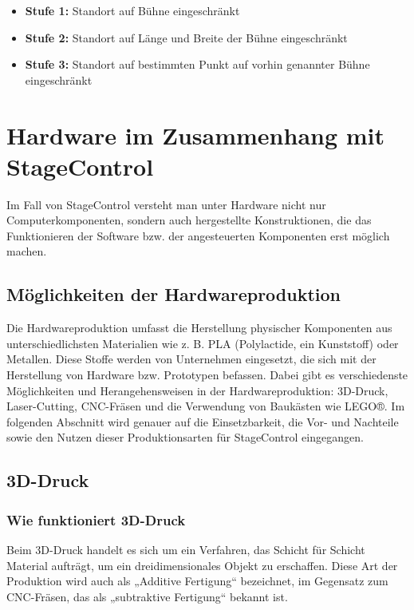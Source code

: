 \begin{itemize}
	\item \textbf{Stufe 1: }Standort auf Bühne eingeschränkt
	\item \textbf{Stufe 2: }Standort auf Länge und Breite der Bühne eingeschränkt
	\item \textbf{Stufe 3: }Standort auf bestimmten Punkt auf vorhin genannter Bühne eingeschränkt
\end{itemize}

\section{Hardware im Zusammenhang mit StageControl}
Im Fall von StageControl versteht man unter Hardware nicht nur Computerkomponenten, sondern auch hergestellte Konstruktionen, die das Funktionieren der Software bzw. der angesteuerten Komponenten erst möglich machen.

\subsection{Möglichkeiten der Hardwareproduktion}
Die Hardwareproduktion umfasst die Herstellung physischer Komponenten aus unterschiedlichsten Materialien wie z. B. PLA (Polylactide, ein Kunststoff) oder Metallen. Diese Stoffe werden von Unternehmen eingesetzt, die sich mit der Herstellung von Hardware bzw. Prototypen befassen. Dabei gibt es verschiedenste Möglichkeiten und Herangehensweisen in der Hardwareproduktion: 3D-Druck, Laser-Cutting, CNC-Fräsen und die Verwendung von Baukästen wie LEGO®. Im folgenden Abschnitt wird genauer auf die Einsetzbarkeit, die Vor- und Nachteile sowie den Nutzen dieser Produktionsarten für StageControl eingegangen.

\subsection{3D-Druck}
\subsubsection{Wie funktioniert 3D-Druck}
Beim 3D-Druck handelt es sich um ein Verfahren, das Schicht für Schicht Material aufträgt, um ein dreidimensionales Objekt zu erschaffen. Diese Art der Produktion wird auch als „Additive Fertigung“ bezeichnet, im Gegensatz zum CNC-Fräsen, das als „subtraktive Fertigung“ bekannt ist.

